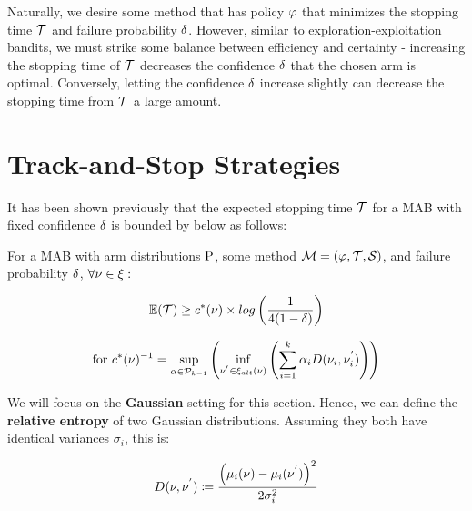 Naturally, we desire some method that has policy $\varphi$ that minimizes the stopping time $\mathcal{T}$ and failure probability $\delta$. However, similar to exploration-exploitation bandits, we must strike some balance between efficiency and certainty - increasing the stopping time of $\mathcal{T}$ decreases the confidence $\delta$ that the chosen arm is optimal. Conversely, letting the confidence $\delta$ increase slightly can decrease the stopping time from $\mathcal{T}$ a large amount.


\section{Track-and-Stop Strategies}
\label{sec:trackandstop}
It has been shown previously that the expected stopping time $\mathcal{T}$ for a MAB with fixed confidence $\delta$ is bounded by below as follows:

\begin{theorem}\label{thm:fixed-confidence}
For a MAB with arm distributions $\mathrm{P}$, some method $\mathcal{M} = (\varphi, \mathcal{T}, \mathcal{S})$, and failure probability $\delta$, $\forall \nu \in \xi:$


\begin{align}
\mathbb{E}(\mathcal{T}) \geq c^*(\nu) \times log\left({\frac{1}{4(1-\delta)}}\right)
\end{align}

\begin{align}
\text{for } c^*(\nu)^{-1} = \sup_{\alpha \in \mathcal{P}_{k-1}}\left(
\inf_{\nu^{'} \in \xi_{alt}(\nu)}\left(
\sum_{i=1}^{k} \alpha_{i} D(\nu_{i}, \nu_{i}^{'})
\right)
\right)
\end{align}
\end{theorem}

We will focus on the \textbf{Gaussian} setting for this section. Hence, we can define the \textbf{relative entropy}  of two Gaussian distributions. Assuming they both have identical variances $\sigma_i$, this is:

\begin{align}
D(\nu, \nu^{'}) \coloneqq \frac{\left( \mu_{i}(\nu) - \mu_{i}(\nu^{'})\right)^2}{2\sigma_i^2}
\end{align}


